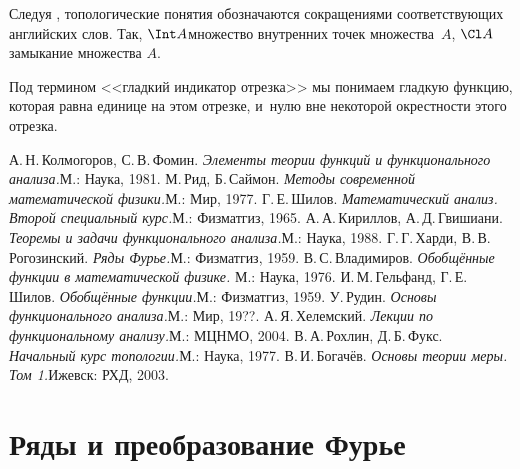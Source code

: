 \documentclass[a4paper]{article}
\begin{document}
\begin{points}{-3}
\item Следуя \cite{rokhlin}, топологические понятия обозначаются сокращениями соответствующих английских слов.
      Так, $\Int A$\т множество внутренних точек множества~$A$, $\Cl A$\т замыкание множества $A$.
\item Под термином <<гладкий индикатор отрезка>> мы понимаем гладкую функцию, которая равна единице на этом отрезке,
и~нулю вне некоторой окрестности этого отрезка.
\end{points}

\begin{thebibliography}{ГШ}
\setlength\itemsep{-2pt}
    А.\,Н.\,Колмогоров, С.\,В.\,Фомин. \emph{Элементы теории функций и функционального анализа.}\т М.: Наука, 1981.
    М.\,Рид, Б.\,Саймон. \emph{Методы современной математической физики.}\т М.: Мир, 1977.
    Г.\,Е.\,Шилов. \emph{Математический анализ. Второй специальный курс.}\т М.: Физматгиз, 1965.
    А.\,А.\,Кириллов, А.\,Д.\,Гвишиани. \emph{Теоремы и задачи функционального анализа.}\т М.: Наука, 1988.
    Г.\,Г.\,Харди, В.\,В.\,Рогозинский. \emph{Ряды Фурье.}\т М.: Физматгиз, 1959.
    В.\,С.\,Владимиров. \emph{Обобщённые функции в математической физике.} М.: Наука, 1976.
    И.\,М.\,Гельфанд, Г.\,Е.\,Шилов. \emph{Обобщённые функции.}\т М.: Физматгиз, 1959.
    У.\,Рудин. \emph{Основы функционального анализа.}\т М.: Мир, 19??.
    А.\,Я.\,Хелемский. \emph{Лекции по функциональному анализу.}\т М.: МЦНМО, 2004.
    В.\,А.\,Рохлин, Д.\,Б.\,Фукс. \emph{Начальный курс топологии.}\т М.: Наука, 1977.
    В.\,И.\,Богачёв. \emph{Основы теории меры. Том 1.}\т Ижевск: РХД, 2003.
\end{thebibliography}

\medskip\dmvntrail

\pagebreak
\pagestyle{headings}

\makeatletter
  \renewcommand{\headheight}{11mm}
  \renewcommand{\headsep}{2mm}
  \renewcommand{\sectionmark}[1]{}
  \renewcommand{\subsectionmark}[1]{}
  \renewcommand{\subsubsectionmark}[1]{\markright{\thesubsubsection. #1}}
  \renewcommand{\@oddhead}{\vbox{\hbox to \textwidth{\scriptsize\thepage\hfil\rightmark\strut}\hrule}}
  \renewcommand{\@oddfoot}{\hfil\thepage\hfil}
\makeatother

\section{Ряды и преобразование Фурье}
\end{document}
